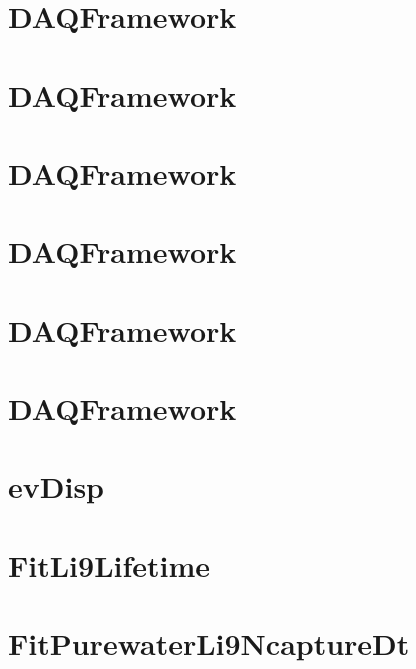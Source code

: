 \let\mypdfximage\pdfximage\def\pdfximage{\immediate\mypdfximage}\documentclass[twoside]{book}
\newcommand{\+}{\discretionary{\mbox{\scriptsize$\hookleftarrow$}}{}{}}
\begin{document}
\chapter{DAQFramework}
\label{md_UserTools_CompareCommons_README}

\chapter{DAQFramework}
\label{md_UserTools_CompareRootFiles_README}

\chapter{DAQFramework}
\label{md_UserTools_CopyHits_README}

\chapter{DAQFramework}
\label{md_UserTools_CutRecorder_README}

\chapter{DAQFramework}
\label{md_UserTools_DataQualityCuts_README}

\chapter{DAQFramework}
\label{md_UserTools_DefineSignalRegions_README}

\chapter{ev\+Disp}
\label{md_UserTools_evDisp_README}

\chapter{Fit\+Li9\+Lifetime}
\label{md_UserTools_FitLi9Lifetime_README}

\chapter{Fit\+Purewater\+Li9\+Ncapture\+Dt}
\label{md_UserTools_FitPurewaterLi9NcaptureDt_README}

\end{document}
